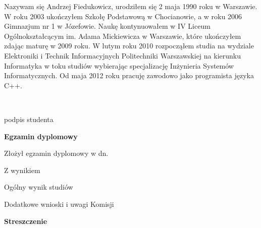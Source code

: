 \begin{titlepage}
    \indent
    Nazywam się Andrzej Fiedukowicz, urodziłem się 2 maja 1990 roku w Warszawie. W roku 2003 ukończyłem Szkołę Podstawową w Chocianowie, a w roku 2006 Gimnazjum nr 1 w Józefowie. Naukę kontynuowałem w IV Liceum Ogólnokształcącym im. Adama Mickiewicza w Warszawie, które ukończyłem zdając maturę w 2009 roku. W lutym roku 2010 rozpocząłem studia na wydziale Elektroniki i Technik Informacyjnych Politechniki Warszawskiej na kierunku Informatyka w toku studiów wybierając specjalizację Inżynieria Systemów Informatycznych. Od maja 2012 roku pracuję zawodowo jako programista języka C++.
    \par
    \vspace{2\baselineskip}
    \hfill\parbox{15em}{{\small\dotfill}\\[-.3ex]
    \centerline{\footnotesize podpis studenta}}\par
    \vspace{3\baselineskip}
    \begin{center}
 	{\large\bfseries Egzamin dyplomowy} \par\bigskip\bigskip
    \end{center}
    \par\noindent\vspace{1.5\baselineskip}
    Złożył egzamin dyplomowy w dn. \dotfill
    \par\noindent\vspace{1.5\baselineskip}
    Z wynikiem \dotfill
    \par\noindent\vspace{1.5\baselineskip}
    Ogólny wynik studiów \dotfill
    \par\noindent\vspace{1.5\baselineskip}
    Dodatkowe wnioski i uwagi Komisji \dotfill
    \par\noindent\vspace{1.5\baselineskip}
    \dotfill

    \newpage\thispagestyle{empty}
    \vspace*{2\baselineskip}
    \begin{center}
	{\large\bfseries Streszczenie}\par\bigskip
    \end{center}


\end{titlepage}

